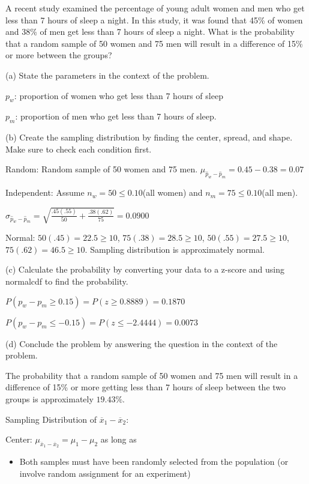 \documentclass[../stats.tex]{subfiles}
\begin{document}
\begin{example}
    A recent study examined the percentage of young adult women and men who get less than 7 hours of sleep a night. In this study, it was found that 45\% of women and 38\% of men get less than 7 hours of sleep a night. What is the probability that a random sample of 50 women and 75 men will result in a difference of 15\% or more between the groups?

    (a) State the parameters in the context of the problem.

    $p_w$: proportion of women who get less than 7 hours of sleep

    $p_m$: proportion of men who get less than 7 hours of sleep.

    (b) Create the sampling distribution by finding the center, spread, and shape. Make sure to check each condition first.

    Random: Random sample of 50 women and 75 men. $\mu_{\hat{p}_w-\hat{p}_m}=0.45-0.38=0.07$

    Independent: Assume $n_w=50\leq 0.10$(all women) and $n_m=75\leq 0.10$(all men).

    $\sigma_{\hat{p}_w-\hat{p}_m}=\sqrt{\frac{.45(.55)}{50}+\frac{.38(.62)}{75}}=0.0900$

    Normal: $50(.45)=22.5\geq 10$, $75(.38)=28.5\geq 10$, $50(.55)=27.5\geq 10$, $75(.62)=46.5\geq 10$. Sampling distribution is approximately normal.

    (c) Calculate the probability by converting your data to a z-score and using normalcdf to find the probability.

    $P(p_w-p_m\geq 0.15) = P(z\geq 0.8889) = 0.1870$

    $P(p_w-p_m\leq -0.15)=P(z\leq -2.4444) = 0.0073$

    (d) Conclude the problem by answering the question in the context of the problem.

    The probability that a random sample of 50 women and 75 men will result in a difference of 15\% or more getting less than 7 hours of sleep between the two groups is approximately $19.43\%$.
\end{example}

Sampling Distribution of $\overline{x}_1-\overline{x}_2$:

Center: $\mu_{\overline{x}_1-\overline{x}_2}=\mu_1-\mu_2$ as long as 
\begin{itemize}
    \item Both samples must have been randomly selected from the population (or involve random assignment for an experiment)
\end{itemize}
\end{document}
